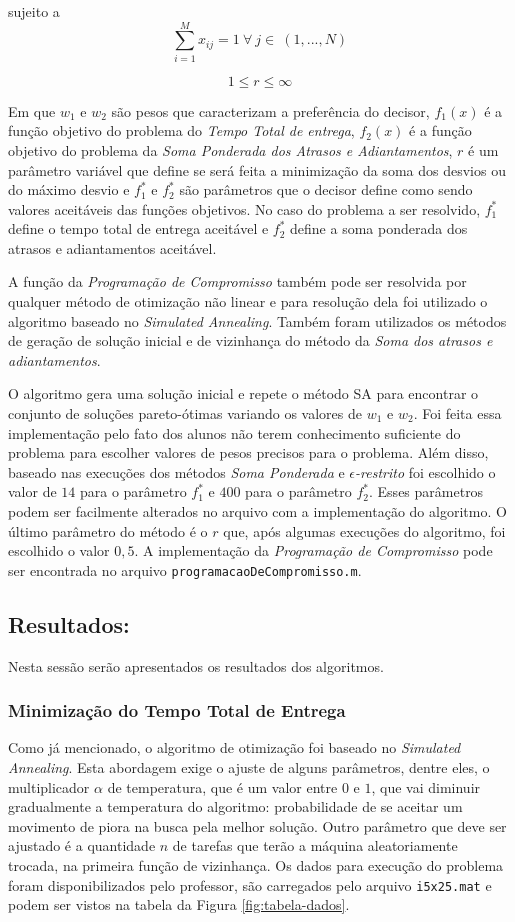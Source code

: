 \documentclass[conference]{IEEEtran}
\begin{document}
sujeito a
\begin{equation}
\sum_{i=1}^{M}x_{ij}=1\ \forall\ j \in\ (1,...,N)
\label{eq:rest5}
\end{equation}

\[1 \le r \le \infty \]

Em que $w_1$ e $w_2$ são pesos que caracterizam a preferência do decisor, $f_1(x)$ é a função objetivo do problema do \emph{Tempo Total de entrega}, $f_2(x)$ é a função objetivo do problema da \emph{Soma Ponderada dos Atrasos e Adiantamentos}, $r$ é um parâmetro variável que define se será feita a minimização da soma dos desvios ou do máximo desvio e $f_{1}^*$ e $f_{2}^{*}$ são parâmetros que o decisor define como sendo valores aceitáveis das funções objetivos. No caso do problema a ser resolvido, $f_1^*$ define o tempo total de entrega aceitável e $f_2^*$ define a soma ponderada dos atrasos e adiantamentos aceitável.

A função da \emph{Programação de Compromisso} também pode ser resolvida por qualquer método de otimização não linear e para resolução dela foi utilizado o algoritmo baseado no \emph{Simulated Annealing}. Também foram utilizados os métodos de geração de solução inicial e de vizinhança do método da \emph{Soma dos atrasos e adiantamentos}.

O algoritmo gera uma solução inicial e repete o método SA para encontrar o conjunto de soluções pareto-ótimas variando os valores de $w_1$ e $w_2$. Foi feita essa implementação pelo fato dos alunos não terem conhecimento suficiente do problema para escolher valores de pesos precisos para o problema. Além disso, baseado nas execuções dos métodos \emph{Soma Ponderada} e \emph{$\epsilon$-restrito} foi escolhido o valor de $14$ para o parâmetro $f_1^*$ e $400$ para o parâmetro $f_2^*$. Esses parâmetros podem ser facilmente alterados no arquivo com a implementação do algoritmo. O último parâmetro do método é o $r$ que, após algumas execuções do algoritmo, foi escolhido o valor $0,5$. A implementação da \emph{Programação de Compromisso} pode ser encontrada no arquivo \texttt{programacaoDeCompromisso.m}.

\subsection{Resultados:}
Nesta sessão serão apresentados os resultados dos algoritmos.
\subsubsection{Minimização do Tempo Total de Entrega}
Como já mencionado, o algoritmo de otimização foi baseado no \textit{Simulated Annealing}. Esta abordagem exige o ajuste de alguns parâmetros, dentre eles, o multiplicador $\alpha$ de temperatura, que é um valor entre $0$ e $1$, que vai diminuir gradualmente a temperatura do algoritmo: probabilidade de se aceitar um movimento de piora na busca pela melhor solução. Outro parâmetro que deve ser ajustado é a quantidade $n$ de tarefas que terão a máquina aleatoriamente trocada, na primeira função de vizinhança. Os dados para execução do problema foram disponibilizados pelo professor, são carregados pelo arquivo \texttt{i5x25.mat} e podem ser vistos na tabela da Figura \ref{fig:tabela-dados}.
\end{document}
